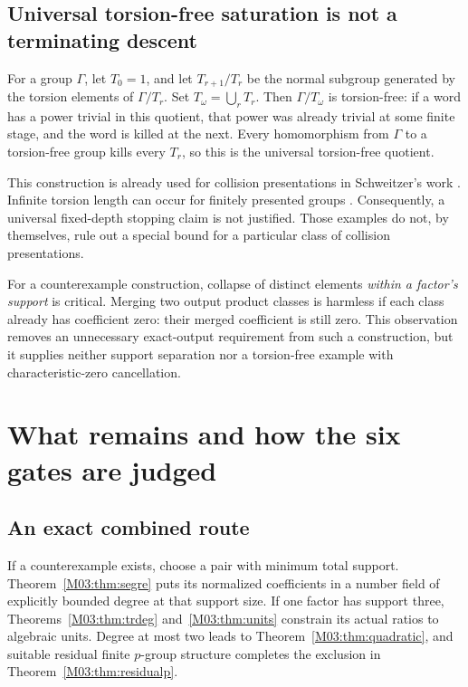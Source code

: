 \documentclass[11pt,a4paper,oneside]{report}
\theoremstyle{definition}
\theoremstyle{remark}
\begin{document}
\subsection{Universal torsion-free saturation is not a terminating descent}
For a group \(\Gamma\), let \(T_0=1\), and let \(T_{r+1}/T_r\) be the normal subgroup generated by the torsion elements of \(\Gamma/T_r\). Set \(T_\omega=\bigcup_rT_r\). Then \(\Gamma/T_\omega\) is torsion-free: if a word has a power trivial in this quotient, that power was already trivial at some finite stage, and the word is killed at the next. Every homomorphism from \(\Gamma\) to a torsion-free group kills every \(T_r\), so this is the universal torsion-free quotient.

This construction is already used for collision presentations in Schweitzer's work \cite{B:Schweitzer}. Infinite torsion length can occur for finitely presented groups \cite{B:ChiodoVyas}. Consequently, a universal fixed-depth stopping claim is not justified. Those examples do not, by themselves, rule out a special bound for a particular class of collision presentations.

For a counterexample construction, collapse of distinct elements \emph{within a factor's support} is critical. Merging two output product classes is harmless if each class already has coefficient zero: their merged coefficient is still zero. This observation removes an unnecessary exact-output requirement from such a construction, but it supplies neither support separation nor a torsion-free example with characteristic-zero cancellation.

\section{What remains and how the six gates are judged}\label{M03:sec:status}
\subsection{An exact combined route}
If a counterexample exists, choose a pair with minimum total support. Theorem~\ref{M03:thm:segre} puts its normalized coefficients in a number field of explicitly bounded degree at that support size. If one factor has support three, Theorems~\ref{M03:thm:trdeg} and~\ref{M03:thm:units} constrain its actual ratios to algebraic units. Degree at most two leads to Theorem~\ref{M03:thm:quadratic}, and suitable residual finite \(p\)-group structure completes the exclusion in Theorem~\ref{M03:thm:residualp}.
\end{document}
